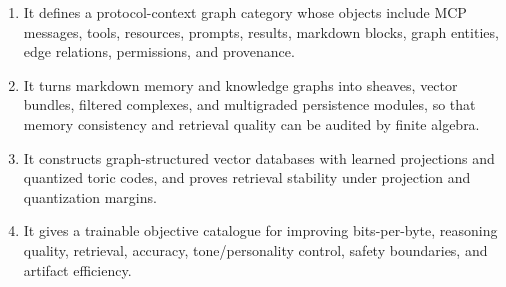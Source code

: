 \documentclass[11pt]{article}
\numberwithin{equation}{section}
\begin{document}
\begin{enumerate}
\item It defines a protocol-context graph category whose objects include MCP messages, tools, resources, prompts, results, markdown blocks, graph entities, edge relations, permissions, and provenance.
\item It turns markdown memory and knowledge graphs into sheaves, vector bundles, filtered complexes, and multigraded persistence modules, so that memory consistency and retrieval quality can be audited by finite algebra.
\item It constructs graph-structured vector databases with learned projections and quantized toric codes, and proves retrieval stability under projection and quantization margins.
\item It gives a trainable objective catalogue for improving bits-per-byte, reasoning quality, retrieval, accuracy, tone/personality control, safety boundaries, and artifact efficiency.
\end{enumerate}
\end{document}
